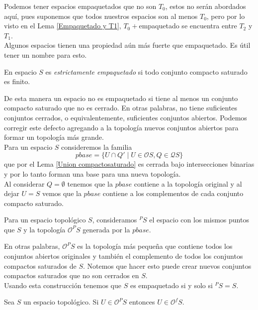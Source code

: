 Podemos tener espacios empaquetados que no son $T_0$, estos no serán abordados aquí, pues suponemos que todos nuestros espacios son al menos $T_0$, pero por lo visto en el Lema \ref{Empaquetado y T1}, $T_0+$empaquetado se encuentra entre $T_2$ y $T_1$.\\

Algunos espacios tienen una propiedad aún más fuerte que empaquetado. Es útil tener un nombre para esto.

\begin{dfn}
    En espacio $S$ es \emph{estrictamente empaquetado} si todo conjunto compacto saturado es finito. 
\end{dfn}

De esta manera un espacio no es empaquetado si tiene al menos un conjunto compacto saturado que no es cerrado. En otras palabras, no tiene suficientes conjuntos cerrados, o equivalentemente, suficientes conjuntos abiertos. Podemos corregir este defecto agregando a la topología nuevos conjuntos abiertos para formar un topología más grande. \\

Para un espacio $S$ consideremos la familia 
\[
pbase=\{U\cap Q'\mid U\in \mathcal{O}S, Q\in \mathcal{Q}S\}
\]
que por el Lema \ref{Union compactosaturado} es cerrada bajo intersecciones binarias y por lo tanto forman una base para una nueva topología.\\

Al considerar $Q=\emptyset$ tenemos que la $pbase$ contiene a la topología original y al dejar $U=S$ vemos que la $pbase$ contiene a los complementos de cada conjunto compacto saturado.\\

\begin{dfn}
    Para un espacio topológico $S$, consideramos $^PS$ el espacio con los mismos puntos que $S$ y la topología $\mathcal{O}^PS$ generada por la $pbase$.
\end{dfn}

En otras palabras, $\mathcal{O}^PS$ es la topología más pequeña que contiene todos los conjuntos abiertos originales y también el complemento de todos los conjuntos compactos saturados de $S$. Notemos que hacer esto puede crear nuevos conjuntos compactos saturados que no son cerrados en $S$.\\

Usando esta construcción tenemos que $S$ es empaquetado si y solo si $^PS=S$.

\begin{lem}
    Sea $S$ un espacio topológico. Si $U\in \mathcal{O}^PS$ entonces $U\in\mathcal{O}^fS$.
\end{lem}


